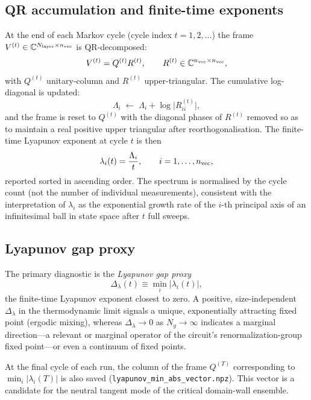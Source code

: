 \documentclass[aps,twocolumn,floatfix,superscriptaddress,nofootinbib]{revtex4-2}
\newcommand{\Nlayer}{N_{\rm layer}}
\newcommand{\lam}{\lambda}
\newcommand{\Dlam}{{\Delta_{\lambda}}}
\begin{document}
\subsection{QR accumulation and finite-time exponents}
At the end of each Markov cycle (cycle index $t=1,2,\ldots$) the frame
$V^{(t)}\in\mathbb{C}^{\Nlayer\times n_{\rm vec}}$ is QR-decomposed:
\begin{equation}
  V^{(t)} = Q^{(t)} R^{(t)},\qquad
  R^{(t)}\in\mathbb{C}^{n_{\rm vec}\times n_{\rm vec}},
\end{equation}
with $Q^{(t)}$ unitary-column and $R^{(t)}$ upper-triangular.  The cumulative
log-diagonal is updated:
\begin{equation}
  \Lambda_i \;\leftarrow\; \Lambda_i + \log\bigl|R^{(t)}_{ii}\bigr|,
\end{equation}
and the frame is reset to $Q^{(t)}$ with the diagonal phases of $R^{(t)}$
removed so as to maintain a real positive upper triangular after reorthogonalisation.
The finite-time Lyapunov exponent at cycle $t$ is then
\begin{equation}
  \lam_i(t) = \frac{\Lambda_i}{t},\qquad i=1,\ldots,n_{\rm vec},
\end{equation}
reported sorted in ascending order.  The spectrum is normalised by the cycle
count (not the number of individual measurements), consistent with the
interpretation of $\lam_i$ as the exponential growth rate of the $i$-th
principal axis of an infinitesimal ball in state space after $t$ full sweeps.

\subsection{Lyapunov gap proxy}
The primary diagnostic is the \emph{Lyapunov gap proxy}
\begin{equation}
  \Dlam(t)\equiv\min_i|\lam_i(t)|,
  \label{eq:gap}
\end{equation}
the finite-time Lyapunov exponent closest to zero.  A positive, size-independent
$\Dlam$ in the thermodynamic limit signals a unique, exponentially attracting
fixed point (ergodic mixing), whereas $\Dlam\to 0$ as $N_y\to\infty$ indicates
a marginal direction---a relevant or marginal operator of the circuit's
renormalization-group fixed point---or even a continuum of fixed points.

At the final cycle of each run, the column of the frame $Q^{(T)}$ corresponding
to $\min_i|\lam_i(T)|$ is also saved (\texttt{lyapunov\_min\_abs\_vector.npz}).
This vector is a candidate for the neutral tangent mode of the critical
domain-wall ensemble.
\end{document}
